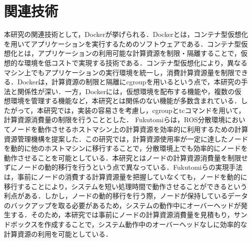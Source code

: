 \documentclass[11pt]{ujarticle} %
\begin{document}
\section{関連技術}
本研究の関連技術として，Dockerが挙げられる．Dockerとは，コンテナ型仮想化を用いてアプリケーションを実行するためのソフトウェアである．コンテナ型仮想化とは，アプリケーションの利用可能な計算資源を制限・隔離することで，仮想的な環境を低コストで実現する技術である．コンテナ型仮想化により，異なるマシン上でもアプリケーションの実行環境を統一し，消費計算資源量を制限できる．Dockerは，計算資源の制限と隔離にcgroupを用いるという点で，本研究の手法と関係性が深い．一方，Dockerには，仮想環境を配布する機能や，複数の仮想環境を管理する機能など，本研究とは関係のない機能が多数含まれている．したがって，本研究では，実装の容易さを考慮し，cgroupとtcコマンドを用いて，計算資源消費量の制限を行うこととした．
Fukutomiらは，ROS分散環境においてノードを動作させるホストマシン上の計算資源を効率的に利用するための計算資源管理機構を提案した\cite{ResourceManeger}．この研究では，計算資源使用率が一定に達したノードを動的に他のホストマシンに移行することで，分散環境上でも効率的にノードを動作させることを可能としている．本研究とはノードの計算資源消費量を制限せずにノードの動的移行を行うという点で異なっている．Fukutomiらの実現手法は，事前にノードの消費する計算資源量を把握していなくても，ノードを動的に移行することにより，システムを短い処理時間で動作させることができるという利点がある．しかし，ノードの動的移行を行う際，ノードが保持しているデータのバックアップを取る必要があるため，システムの動作中にオーバーヘッドが発生する．そのため，本研究では事前にノードの計算資源消費量を見積もり，サンドボックスを作成することで，システム動作中のオーバーヘッドなしに効率的な計算資源の利用を可能としている．
\end{document}
